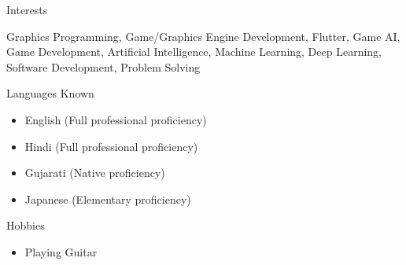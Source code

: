 \documentclass{resume}
\begin{document}
\begin{rSection}{Interests} 
\begin{itemize}
    Graphics Programming, Game/Graphics Engine Development, Flutter, Game AI, Game Development, Artificial Intelligence, Machine Learning, Deep Learning, Software Development, Problem Solving
\end{itemize}
\end{rSection}

\begin{rSection}{Languages Known} 
\begin{itemize}
    \item English (Full professional proficiency)
    \item Hindi (Full professional proficiency)
    \item Gujarati (Native proficiency)
    \item Japanese (Elementary proficiency)
\end{itemize}
\end{rSection}

\begin{rSection}{Hobbies} 
\begin{itemize}
    \item Playing Guitar
\end{itemize}
\end{rSection}
\end{document}
